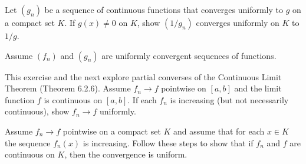 \begin{solution}
  \TODO
\end{solution}
\begin{exercise}
  Let $\left(g_{n}\right)$ be a sequence of continuous functions that converges uniformly to $g$ on a compact set $K$. If $g(x) \neq 0$ on $K$, show $\left(1 / g_{n}\right)$ converges uniformly on $K$ to $1 / g$.

\end{exercise}
\begin{solution}
  \TODO
\end{solution}
\begin{exercise}
  Assume $\left(f_{n}\right)$ and $\left(g_{n}\right)$ are uniformly convergent sequences of functions.
\end{exercise}
\begin{solution}
  \TODO
\end{solution}
\begin{exercise}
  This exercise and the next explore partial converses of the Continuous Limit Theorem (Theorem 6.2.6). Assume $f_{n} \rightarrow f$ pointwise on $[a, b]$ and the limit function $f$ is continuous on $[a, b]$. If each $f_{n}$ is increasing (but not necessarily continuous), show $f_{n} \rightarrow f$ uniformly.


\end{exercise}
\begin{solution}
  \TODO
\end{solution}
\begin{exercise}
  Assume $f_{n} \rightarrow f$ pointwise on a compact set $K$ and assume that for each $x \in K$ the sequence $f_{n}(x)$ is increasing. Follow these steps to show that if $f_{n}$ and $f$ are continuous on $K$, then the convergence is uniform.
\end{exercise}

